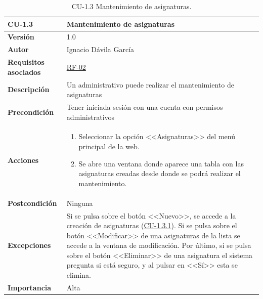 \begin{table}[p]
	\centering
	\begin{tabularx}{\linewidth}{ p{} p{} }
		\toprule
		\textbf{CU-1.3}    & \textbf{Mantenimiento de asignaturas}\\
		\toprule
		\textbf{Versión}              & 1.0    \\
		\textbf{Autor}                & Ignacio Dávila García \\
		\textbf{Requisitos asociados} & \hyperref[itm:RF2]{RF-02} \\
		\textbf{Descripción}          & Un administrativo puede realizar el mantenimiento de asignaturas \\
		\textbf{Precondición}         & Tener iniciada sesión con una cuenta con permisos administrativos \\
		\textbf{Acciones}             &
		\begin{enumerate}
			\def\labelenumi{\arabic{enumi}.}
			\tightlist
			\item Seleccionar la opción <<Asignaturas>> del menú principal de la web.
			\item Se abre una ventana donde aparece una tabla con las asignaturas creadas desde donde se podrá realizar el mantenimiento.
		\end{enumerate}\\
		\textbf{Postcondición}        & Ninguna \\
		\textbf{Excepciones}          & Si se pulsa sobre el botón <<Nuevo>>, se accede a la creación de asignaturas (\hyperref[table:CU-1.3.1]{CU-1.3.1}). Si se pulsa sobre el botón <<Modificar>> de una asignaturas de la lista se accede a la ventana de modificación. Por último, si se pulsa sobre el botón <<Eliminar>> de una asignatura el sistema pregunta si está seguro, y al pulsar en <<Sí>> esta se elimina. \\
		\textbf{Importancia}          & Alta \\
		\bottomrule
	\end{tabularx}
	\caption{CU-1.3 Mantenimiento de asignaturas.}
\end{table}
\FloatBarrier

